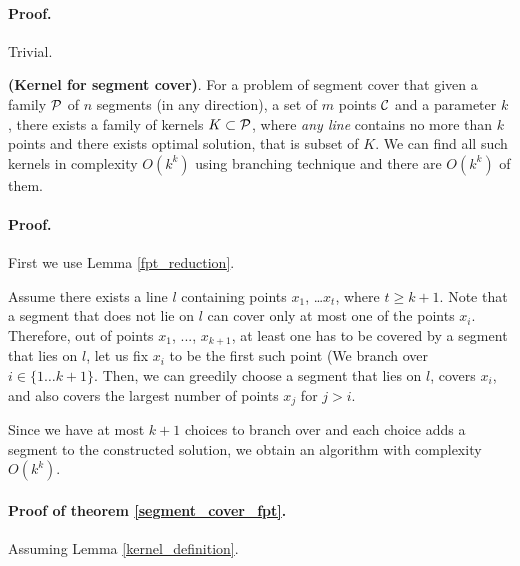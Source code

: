 \paragraph{Proof.} Trivial.

\begin{lemma}
	\label{kernel_definition}
	\textbf{(Kernel for segment cover)}.
	For a problem of segment cover that given a family $\mathcal{P}$ of
	$n$ segments (in any direction),
	a set of $m$ points $\mathcal{C}$
	and a parameter $k$, there exists a family of
	kernels $K \subset \mathcal{P}$,
	where \textit{any line} contains no more than $k$ points
	and there exists optimal solution, that is subset of $K$.
	We can find all such kernels in complexity $O(k^k)$ using branching technique
	and there are $O(k^k)$ of them.
\end{lemma}

\paragraph{Proof.}



First we use Lemma \ref{fpt_reduction}.

Assume there exists a line $l$ containing points $x_1$, \ldots $x_t$,
where $t \geq k + 1$.
Note that a segment that does not lie on $l$ can cover only at most one
of the points $x_i$.
Therefore, out of points $x_1$, ..., $x_{k+1}$,
at least one has to be covered by a segment that lies on $l$,
let us fix $x_i$ to be the first such point (We branch over $i \in \{1 \dots k+1\}$.
Then, we can greedily choose a segment that lies on $l$,
covers $x_i$,
and also covers the largest number of points $x_j$ for $j > i$.

Since we have at most $k + 1$ choices to branch over
and each choice adds a segment to the constructed solution,
we obtain an algorithm with complexity $O(k^k)$.

\paragraph{Proof of theorem \ref{segment_cover_fpt}.} Assuming Lemma \ref{kernel_definition}.

